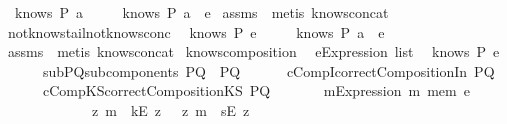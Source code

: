 \begin{isabellebody}
\ {\isachardoublequoteopen}{\isasymnot}\ knows\ P\ {\isacharbrackleft}a{\isacharbrackright}{\isachardoublequoteclose}\isanewline
{}\ \ \ \ {\isachardoublequoteopen}{\isasymnot}\ knows\ P\ {\isacharparenleft}a\ {\isacharhash}\ e{\isacharparenright}{\isachardoublequoteclose}\isanewline
\isadelimproof
\endisadelimproof
\isatagproof
{}\isamarkupfalse \ assms\ \isamarkupfalse \ {\isacharparenleft}metis\ knows{\isacharunderscore}concat{\isacharunderscore}{}{\isacharparenright}\endisatagproof
{\isafoldproof}\isadelimproof
\isanewline
\endisadelimproof
\isanewline
{}\isamarkupfalse \ not{\isacharunderscore}knows{\isacharunderscore}tail{\isacharunderscore}not{\isacharunderscore}knows{\isacharunderscore}conc{\isacharcolon}\isanewline
{}\ {\isachardoublequoteopen}{\isasymnot}\ knows\ P\ e{\isachardoublequoteclose}\isanewline
{}\ \ \ \ {\isachardoublequoteopen}{\isasymnot}\ knows\ P\ {\isacharparenleft}a\ {\isacharhash}\ e{\isacharparenright}{\isachardoublequoteclose}\isanewline
\isadelimproof
\endisadelimproof
\isatagproof
{}\isamarkupfalse \ assms\ \isamarkupfalse \ {\isacharparenleft}metis\ knows{\isacharunderscore}concat{\isacharunderscore}{}{\isacharparenright}\endisatagproof
{\isafoldproof}\isadelimproof
\isanewline
\endisadelimproof
\isanewline
{}\isamarkupfalse \ knows{\isacharunderscore}composition{}{\isacharcolon}\isanewline
\ \ e{\isacharcolon}{\isacharcolon}{\isachardoublequoteopen}Expression\ list{\isachardoublequoteclose}\isanewline
\ \ {\isachardoublequoteopen}knows\ P\ e{\isachardoublequoteclose}\isanewline
\ \ \ \ \ \ subPQ{\isacharcolon}{\isachardoublequoteopen}subcomponents\ PQ\ {\isacharequal}\ {\isacharbraceleft}P{\isacharcomma}Q{\isacharbraceright}{\isachardoublequoteclose}\isanewline
\ \ \ \ \ \ cCompI{\isacharcolon}{\isachardoublequoteopen}correctCompositionIn\ PQ{\isachardoublequoteclose}\isanewline
\ \ \ \ \ \ cCompKS{\isacharcolon}{\isachardoublequoteopen}correctCompositionKS\ PQ{\isachardoublequoteclose}\isanewline
\ \ \ \ \ \ {\isachardoublequoteopen}{\isasymforall}\ {\isacharparenleft}m{\isacharcolon}{\isacharcolon}Expression{\isacharparenright}{\isachardot}\ {\isacharparenleft}{\isacharparenleft}m\ mem\ e{\isacharparenright}\ {\isasymlongrightarrow}\ \isanewline
\ \ \ \ \ \ \ \ \ \ \ \ {\isacharparenleft}{\isacharparenleft}{\isasymexists}\ z{}{\isachardot}\ m\ {\isacharequal}\ {\isacharparenleft}kE\ z{}{\isacharparenright}{\isacharparenright}\ {\isasymor}\ {\isacharparenleft}{\isasymexists}\ z{}{\isachardot}\ m\ {\isacharequal}\ {\isacharparenleft}sE\ z{}{\isacharparenright}{\isacharparenright}{\isacharparenright}{\isacharparenright}{\isachardoublequoteclose}\isanewline

\end{isabellebody}
